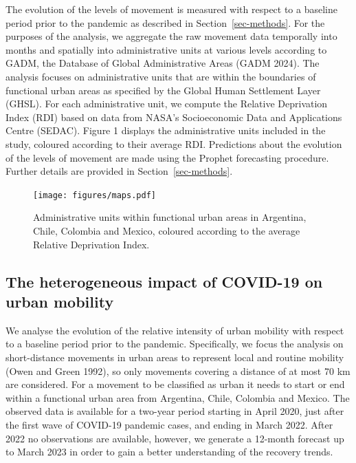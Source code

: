 \documentclass[
  11pt,
]{article}
\begin{document}
The evolution of the levels of movement is measured with respect to a
baseline period prior to the pandemic as described in
Section~\ref{sec-methods}. For the purposes of the analysis, we
aggregate the raw movement data temporally into months and spatially
into administrative units at various levels according to GADM, the
Database of Global Administrative Areas (GADM 2024). The analysis
focuses on administrative units that are within the boundaries of
functional urban areas as specified by the Global Human Settlement Layer
(GHSL). For each administrative unit, we compute the Relative
Deprivation Index (RDI) based on data from NASA's Socioeconomic Data and
Applications Centre (SEDAC). Figure 1 displays the administrative units
included in the study, coloured according to their average RDI.
Predictions about the evolution of the levels of movement are made using
the Prophet forecasting procedure. Further details are provided in
Section~\ref{sec-methods}.

\begin{figure}[H]

{\centering \texttt{[image: figures/maps.pdf]}

}

\caption{Administrative units within functional urban areas in
Argentina, Chile, Colombia and Mexico, coloured according to the average
Relative Deprivation Index.}

\end{figure}%

\subsection{The heterogeneous impact of COVID-19 on urban
mobility}\label{the-heterogeneous-impact-of-covid-19-on-urban-mobility}

We analyse the evolution of the relative intensity of urban mobility
with respect to a baseline period prior to the pandemic. Specifically,
we focus the analysis on short-distance movements in urban areas to
represent local and routine mobility (Owen and Green 1992), so only
movements covering a distance of at most 70 km are considered. For a
movement to be classified as urban it needs to start or end within a
functional urban area from Argentina, Chile, Colombia and Mexico. The
observed data is available for a two-year period starting in April 2020,
just after the first wave of COVID-19 pandemic cases, and ending in
March 2022. After 2022 no observations are available, however, we
generate a 12-month forecast up to March 2023 in order to gain a better
understanding of the recovery trends.
\end{document}
